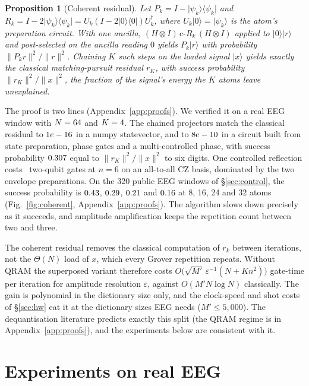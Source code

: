 \documentclass{article}
\newtheorem{proposition}{Proposition}
\newcommand{\ket}[1]{\lvert #1\rangle}
\newcommand{\bra}[1]{\langle #1\rvert}
\newcommand{\norm}[1]{\lVert #1\rVert}
\begin{document}
\begin{proposition}[Coherent residual]
\label{prop:coherent}
Let $P_k=I-\ket{\psi_k}\bra{\psi_k}$ and $R_k=I-2\ket{\psi_k}\bra{\psi_k}=U_k(I-2\ket{0}\bra{0})U_k^\dagger$, where $U_k\ket{0}=\ket{\psi_k}$ is the atom's preparation circuit. With one ancilla, $(H\otimes I)\,\mathrm{c}\text{-}R_k\,(H\otimes I)$ applied to $\ket{0}\ket{r}$ and post-selected on the ancilla reading $0$ yields $P_k\ket{r}$ with probability $\norm{P_kr}^2/\norm{r}^2$. Chaining $K$ such steps on the loaded signal $\ket{x}$ yields exactly the classical matching-pursuit residual $r_K$, with success probability $\norm{r_K}^2/\norm{x}^2$, the fraction of the signal's energy the $K$ atoms leave unexplained.
\end{proposition}
The proof is two lines (Appendix~\ref{app:proofs}). We verified it on a real EEG window with $N=64$ and $K=4$. The chained projectors match the classical residual to $1e-16$ in a numpy statevector, and to $8e-10$ in a circuit built from state preparation, phase gates and a multi-controlled phase, with success probability $0.307$ equal to $\norm{r_K}^2/\norm{x}^2$ to six digits. One controlled reflection costs \cohReflCZ\ two-qubit gates at $n=6$ on an all-to-all CZ basis, dominated by the two envelope preparations. On the 320 public EEG windows of \S\ref{sec:control}, the success probability is $0.43$, $0.29$, $0.21$ and $0.16$ at 8, 16, 24 and 32 atoms (Fig.~\ref{fig:coherent}, Appendix~\ref{app:proofs}). The algorithm slows down precisely as it succeeds, and amplitude amplification keeps the repetition count between two and three.

The coherent residual removes the classical computation of $r_k$ between iterations, not the $\Theta(N)$ load of $x$, which every Grover repetition repeats. Without QRAM the superposed variant therefore costs $O\big(\sqrt{M'}\,\varepsilon^{-1}(N+Kn^2)\big)$ gate-time per iteration for amplitude resolution $\varepsilon$, against $O(M'N\log N)$ classically. The gain is polynomial in the dictionary size only, and the clock-speed and shot costs of \S\ref{sec:hw} eat it at the dictionary sizes EEG needs ($M'\le 5{,}000$). The dequantisation literature \citep{aaronson2015fineprint,tang2019quantum,chia2020sampling,tang2022dequantizing} predicts exactly this split (the QRAM regime is in Appendix~\ref{app:proofs}), and the experiments below are consistent with it.


\section{Experiments on real EEG}
\label{sec:exp}
\end{document}
